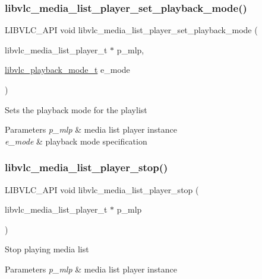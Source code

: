 \subsubsection{\texorpdfstring{libvlc\+\_\+media\+\_\+list\+\_\+player\+\_\+set\+\_\+playback\+\_\+mode()}{libvlc\_media\_list\_player\_set\_playback\_mode()}}
{\footnotesize\ttfamily L\+I\+B\+V\+L\+C\+\_\+\+A\+PI void libvlc\+\_\+media\+\_\+list\+\_\+player\+\_\+set\+\_\+playback\+\_\+mode (\begin{DoxyParamCaption}\item[{libvlc\+\_\+media\+\_\+list\+\_\+player\+\_\+t $\ast$}]{p\+\_\+mlp,  }\item[{\hyperlink{group__libvlc__media__list__player_ga1f0139f9220d7578fab37a3c1a74af9c}{libvlc\+\_\+playback\+\_\+mode\+\_\+t}}]{e\+\_\+mode }\end{DoxyParamCaption})}

Sets the playback mode for the playlist


\begin{DoxyParams}{Parameters}
{\em p\+\_\+mlp} & media list player instance \\
\hline
{\em e\+\_\+mode} & playback mode specification \\
\hline
\end{DoxyParams}
\mbox{\label{group__libvlc__media__list__player_ga06d8e55e82ef254099826f33ff09ff69}} 
\subsubsection{\texorpdfstring{libvlc\+\_\+media\+\_\+list\+\_\+player\+\_\+stop()}{libvlc\_media\_list\_player\_stop()}}
{\footnotesize\ttfamily L\+I\+B\+V\+L\+C\+\_\+\+A\+PI void libvlc\+\_\+media\+\_\+list\+\_\+player\+\_\+stop (\begin{DoxyParamCaption}\item[{libvlc\+\_\+media\+\_\+list\+\_\+player\+\_\+t $\ast$}]{p\+\_\+mlp }\end{DoxyParamCaption})}

Stop playing media list


\begin{DoxyParams}{Parameters}
{\em p\+\_\+mlp} & media list player instance \\
\hline
\end{DoxyParams}
